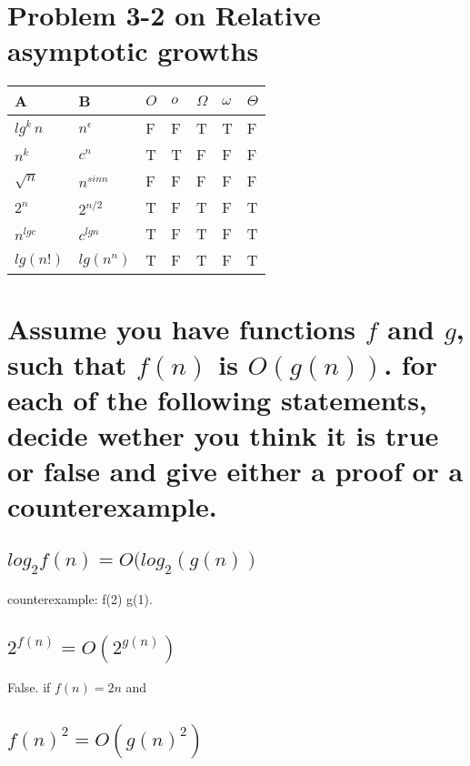 \documentclass[titlepage]{article}\usepackage[]{graphicx}\usepackage[]{color}
\begin{document}
\section{ Problem 3-2 on Relative asymptotic growths}
\begin{table}[h]
  \begin{tabular}{ll|l|l|l|l|l}
	A & B  & $O$  & $o$  & $\Omega$  & $\omega$  & $\Theta$  \\ \hline	
	$lg^k\,n$ &  $n^\epsilon$   & F  & F  & T   &T  &F  \\ \hline	
	$n^k$     & $c^n$  & T & T  &F  &F  &F  \\ \hline	
	$\sqrt{n}$ & $n^{sin n}$  & F  &  F &  F &  F &  F \\ \hline	
	$2^n$  & $2^{n/2}$   & T &F  & T  & F  & T  \\ \hline	
	$n^{lg c}$ & $c^{lg n}$ & T  & F & T  & F  & T  \\ \hline	
	$lg(n!)$ & $lg(n^n)$ &T   & F  &T  &F  & T  
  \end{tabular}
\end{table}


\section{ Assume you have functions $f$ and $g$, such that $f(n)$ is $O(g(n))$.
  for each of the following statements, decide wether you think it is true or false and give
either a proof or a counterexample. }

\subsection{ $log_2f(n) = O(log_2(g(n))$}

counterexample: f(2) g(1).


\subsection{ $2^{ f(n) } = O(2^{ g(n) })$}
False.
if $f(n) = 2n$ and 

\subsection{$  f(n)^2 = O(g(n)^2)$}
\end{document}
